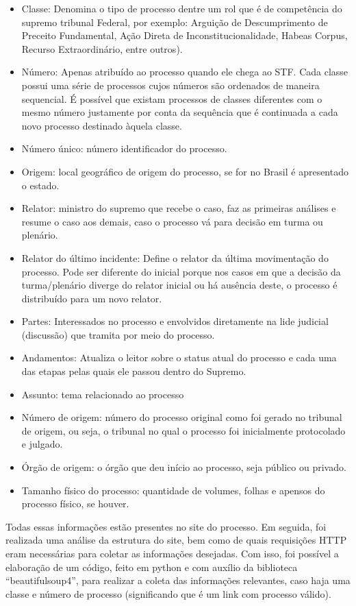 \begin{itemize}
    \item Classe: Denomina o tipo de processo dentre um rol que é de competência do supremo tribunal Federal, por exemplo: Arguição de Descumprimento de Preceito Fundamental, Ação Direta de Inconstitucionalidade, Habeas Corpus, Recurso Extraordinário, entre outros).
    \item Número: Apenas atribuído ao processo quando ele chega ao STF. Cada classe possui uma série de processos cujos números são ordenados de maneira sequencial. É possível que existam processos de classes diferentes com o mesmo número justamente por conta da sequência que é continuada a cada novo processo destinado àquela classe.
    \item Número único: número identificador do processo.
    \item Origem: local geográfico de origem do processo, se for no Brasil é apresentado o estado.   
    \item Relator: ministro do supremo que recebe o caso, faz as primeiras análises e resume o caso aos demais, caso o processo vá para decisão em turma ou plenário.
    \item Relator do último incidente: Define o relator da última movimentação do processo. Pode ser diferente do inicial porque nos casos em que a decisão da turma/plenário diverge do relator inicial ou há ausência deste, o  processo é distribuído para um novo relator.
    \item Partes: Interessados no processo e envolvidos diretamente na lide judicial (discussão) que tramita por meio do processo. 
    \item Andamentos: Atualiza o leitor sobre o status atual do processo e cada uma das etapas pelas quais ele passou dentro do Supremo. 
    \item Assunto: tema relacionado ao processo
    \item Número de origem: número do processo original como foi gerado no tribunal de origem, ou seja, o tribunal no qual o processo foi inicialmente protocolado e julgado. 
    \item Órgão de origem: o órgão que deu início ao processo, seja público ou privado.
    \item Tamanho físico do processo: quantidade de volumes, folhas e apensos do processo físico, se houver. 
\end{itemize}

Todas essas informações estão presentes no site do processo.
Em seguida, foi realizada uma análise da estrutura do site, bem como de quais requisições HTTP eram necessárias para coletar as informações desejadas. Com isso, foi possível a elaboração de um código, feito em python e com auxílio da biblioteca “beautifulsoup4”, para realizar a coleta das informações relevantes, caso haja uma classe e número de processo (significando que é um link com processo válido). 

